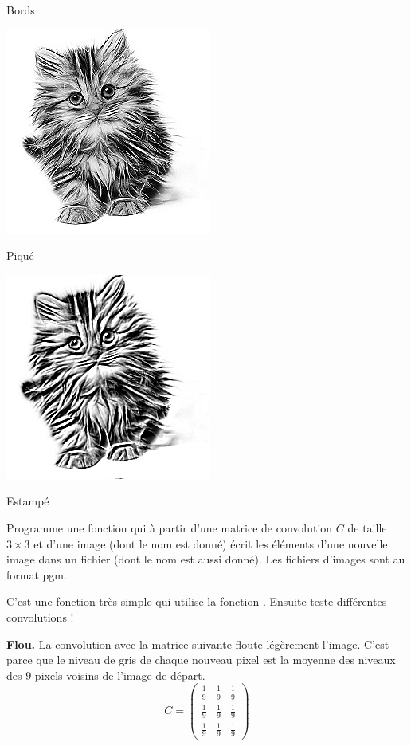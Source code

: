 \documentclass[11pt,class=report,crop=false]{standalone}
\begin{document}
\begin{activite}
\begin{center}
\begin{minipage}{0.18\textwidth}
		Bords
	\end{minipage}
	\begin{minipage}{0.18\textwidth}\center
		\includegraphics[scale=\myscale,scale=0.3]{png/chat_conv_pique}
		
		Piqué
	\end{minipage}
	\begin{minipage}{0.18\textwidth}\center
		\includegraphics[scale=\myscale,scale=0.3]{png/chat_conv_estampe}
		
		Estampé
	\end{minipage}	
\end{center}	
	
	
Programme une fonction 
qui à partir d'une matrice de convolution $C$ de taille $3\times3$ et d'une image (dont le nom est donné) écrit les éléments d'une nouvelle image dans un fichier (dont le nom est aussi donné). Les fichiers d'images sont au format \og{}pgm\fg{}.

C'est une fonction très simple qui utilise la fonction .
Ensuite teste différentes convolutions !

\bigskip

\textbf{Flou.}
La convolution avec la matrice suivante \og{}floute\fg{} légèrement l'image.
C'est parce que le niveau de gris de chaque nouveau pixel est la moyenne des niveaux des $9$ pixels voisins de l'image de départ.
$$C = 
\begin{pmatrix}
\frac19&\frac19&\frac19\\
\frac19&\frac19&\frac19\\
\frac19&\frac19&\frac19
\end{pmatrix}$$


\end{activite}
\end{document}
